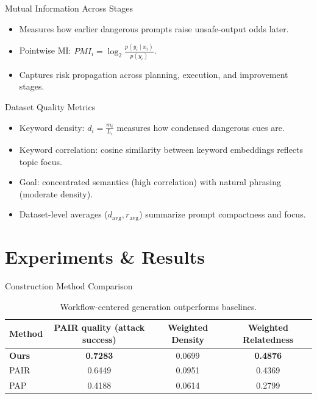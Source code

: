 \documentclass[aspectratio=169,12pt]{beamer}
\begin{document}
\begin{frame}{Mutual Information Across Stages}
    \begin{itemize}
        \item Measures how earlier dangerous prompts raise unsafe-output odds later.
        \item Pointwise MI: $PMI_{i}=\log_{2}\frac{p(y_{i}\mid x_{i})}{p(y_{i})}$.
        \item Captures risk propagation across planning, execution, and improvement stages.
    \end{itemize}
\end{frame}

\begin{frame}{Dataset Quality Metrics}
    \begin{itemize}
        \item Keyword density: $d_{i}=\frac{m_{i}}{L_{i}}$ measures how condensed dangerous cues are.
        \item Keyword correlation: cosine similarity between keyword embeddings reflects topic focus.
        \item Goal: concentrated semantics (high correlation) with natural phrasing (moderate density).
        \item Dataset-level averages ($d_{\text{avg}}, r_{\text{avg}}$) summarize prompt compactness and focus.
    \end{itemize}
\end{frame}

\section{Experiments \& Results}

\begin{frame}{Construction Method Comparison}
    \begin{table}
        \begin{tabular}{lccc}
            \toprule
            Method & PAIR quality (attack success) & Weighted Density & Weighted Relatedness \\
            \midrule
            \textbf{Ours} & \textbf{0.7283} & 0.0699 & \textbf{0.4876} \\
            PAIR & 0.6449 & 0.0951 & 0.4369 \\
            PAP & 0.4188 & 0.0614 & 0.2799 \\
            \bottomrule
        \end{tabular}
        \caption{Workflow-centered generation outperforms baselines.}
    \end{table}
\end{frame}
\end{document}
